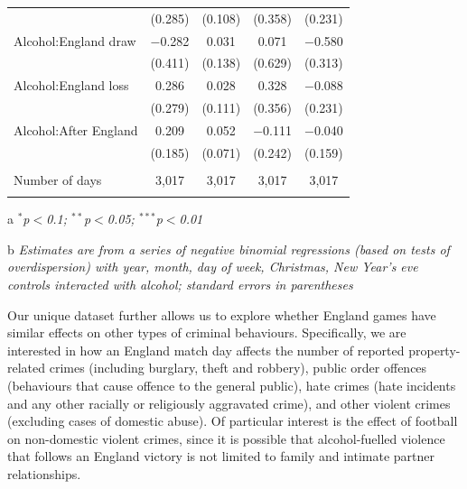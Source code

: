 \documentclass[12pt, letterpaper]{article}
\begin{document}
\begin{table}
{\begin{threeparttable}
\begin{tabular}{@{\extracolsep{5pt}}lcccc}
  & (0.285) & (0.108) & (0.358) & (0.231) \\ 
  Alcohol:England draw & $-$0.282 & 0.031 & 0.071 & $-$0.580 \\ 
  & (0.411) & (0.138) & (0.629) & (0.313) \\ 
  Alcohol:England loss & 0.286 & 0.028 & 0.328 & $-$0.088 \\ 
  & (0.279) & (0.111) & (0.356) & (0.231) \\ 
  Alcohol:After England & 0.209 & 0.052 & $-$0.111 & $-$0.040 \\ 
  & (0.185) & (0.071) & (0.242) & (0.159) \\ 
 \hline \\[-1.8ex] 
Number of days & 3,017 & 3,017 & 3,017 & 3,017 \\ 
\hline \\[-1.8ex] 
\end{tabular} 
\begin{tablenotes}
      \item[a] \textit{$^{*}$p$<$0.1; $^{**}$p$<$0.05; $^{***}$p$<$0.01}
      \item[b] \textit{Estimates are from a series of negative binomial regressions (based on tests of overdispersion)  with year, month, day of week, Christmas, New Year's eve controls interacted with alcohol; standard errors in parentheses}
    \end{tablenotes}
\end{threeparttable} }
\end{table}


Our unique dataset further allows us to explore whether England games have similar effects on other types of criminal behaviours. Specifically, we are interested in how an England match day affects the number of reported property-related crimes (including burglary, theft and robbery), public order offences (behaviours that cause offence to the general public), hate crimes (hate incidents and any other racially or religiously aggravated crime), and other violent crimes (excluding cases of domestic abuse). Of particular interest is the effect of football on non-domestic violent crimes, since it is possible that alcohol-fuelled violence that follows an England victory is not limited to family and intimate partner relationships.
\end{document}
